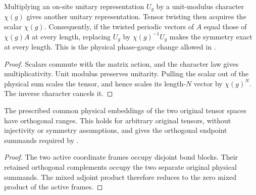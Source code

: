 \begin{lemma}
    \label{thm:spt_physical_character_twist}
    \leanok
    Multiplying an on-site unitary representation $U_g$ by a unit-modulus
    character $\chi(g)$ gives another unitary representation.
    Tensor twisting then acquires the scalar $\chi(g)$.
    Consequently, if the twisted periodic vectors of $A$ equal those of
    $\chi(g)A$ at every length, replacing $U_g$ by $\chi(g)^{-1}U_g$
    makes the symmetry exact at every length.
    This is the physical phase-gauge change allowed in
    \cite[Section~II.C.2 and Appendix~B]{Schuch2011Phases}.
\end{lemma}

\begin{proof}\leanok
    Scalars commute with the matrix action, and the character law gives
    multiplicativity. Unit modulus preserves unitarity. Pulling the scalar
    out of the physical sum scales the tensor, and hence scales its
    length-$N$ vector by $\chi(g)^N$. The inverse character cancels it.
\end{proof}

\begin{lemma}
    \label{thm:spt_common_physical_endpoint_orthogonality}
    \leanok

    The prescribed common physical embeddings of the two original tensor
    spaces have orthogonal ranges. This holds for arbitrary original
    tensors, without injectivity or symmetry assumptions, and gives
    the orthogonal endpoint summands required by
    \cite[Section~II.C.2]{Schuch2011Phases}.
\end{lemma}

\begin{proof}\leanok
    The two active coordinate frames occupy disjoint bond blocks.
    Their retained orthogonal complements occupy the two separate
    original physical summands. The mixed adjoint product therefore
    reduces to the zero mixed product of the active frames.
\end{proof}

